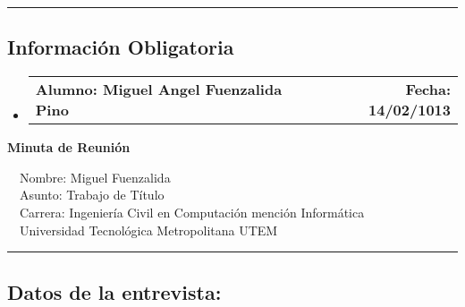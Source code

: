 \documentclass[10pt,letterpaper]{article}
\makeatletter
\newcommand{\headerrow}[2]
{\begin{tabular*}{\linewidth}{l@{\extracolsep{\fill}}r}
	#1 &
	#2 \\
\end{tabular*}}
\makeatother
\begin{document}
\hrule
\vspace{-0.4em}
\subsection*{Información Obligatoria}

\begin{itemize}
	\parskip=0.1em

	\item 
	\headerrow
		{\textbf{Alumno: Miguel Angel Fuenzalida Pino}}
		{\textbf{Fecha: 14/02/1013}}

\end{itemize}
\newpage
\begin{center}
{\LARGE \textbf{Minuta de Reunión}}

\ \ \textbullet Nombre: Miguel Fuenzalida
\\
\ \ \textbullet Asunto: Trabajo de Título
\\
\ \ \textbullet Carrera: Ingeniería Civil en Computación mención Informática
\\
\ \ \textbullet Universidad Tecnológica Metropolitana UTEM
\end{center}

\hrule
\vspace{-0.4em}
\subsection*{Datos de la entrevista:}
\end{document}
